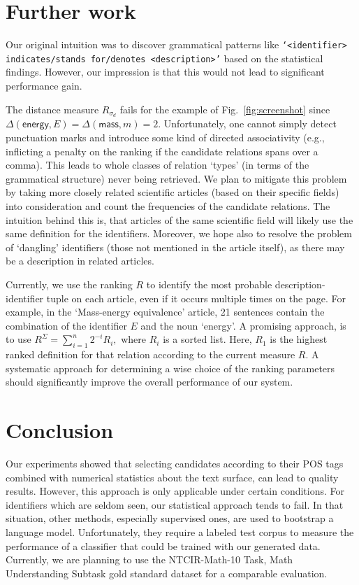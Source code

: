 \documentclass[runningheads]{llncs}
\begin{document}
\section{Further work}

Our original intuition was to discover grammatical patterns like
\texttt{`\emph{<identifier>} indicates/stands for/denotes
\emph{<description>}'} based on the statistical findings. However, our
impression is that this would not lead to significant performance gain.

The distance measure $R_{\sigma_d}$ fails for the example of
Fig.~\ref{fig:screenshot} since $\Delta(\mathsf{energy},E) =
\Delta(\mathsf{mass},m) = 2$. Unfortunately, one cannot simply detect
punctuation marks and introduce some kind of directed associativity 
(e.g., inflicting a penalty on the ranking if the candidate relations spans over a
comma). This leads to whole classes of relation `types' (in terms of the
grammatical structure) never being retrieved. We plan to mitigate this problem
by taking more closely related scientific articles (based on their specific
fields) into consideration and count the frequencies of the candidate
relations. The intuition behind this is, that articles of the same scientific
field will likely use the same definition for the identifiers. Moreover,
we hope also to resolve the problem of `dangling' identifiers (those not
mentioned in the article itself), as there may be a description in related
articles.


Currently, we use the ranking $R$ to identify the most probable description-
identifier tuple on each article, even if it occurs multiple times on the page.
For example, in the `Mass-energy equivalence' article, 21 sentences contain the
combination of the identifier $E$ and the noun `energy'. A promising approach,
is to use $R^\Sigma=\sum_{i=1}^n 2^{-i} R_i,$ where $R_i$ is a sorted list.
Here, $R_1$ is the highest ranked definition for that relation according to the
current measure $R$.  A systematic approach for determining a wise choice of the
ranking parameters should significantly improve the overall performance of our
system.


\section{Conclusion}

Our experiments showed that selecting candidates according to their POS tags
combined with numerical statistics about the text surface, can lead to quality
results. However, this approach is only applicable under certain conditions.
For identifiers which are seldom seen, our statistical approach tends to fail.
In that situation, other methods, especially supervised ones, are used to
bootstrap a language model. Unfortunately, they require a labeled test corpus
to measure the performance of a classifier that could be trained with our
generated data. Currently, we are planning to use the NTCIR-Math-10 Task, Math
Understanding Subtask gold standard dataset \cite{overview} for a comparable
evaluation.
\end{document}
